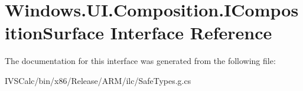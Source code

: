 \hypertarget{interface_windows_1_1_u_i_1_1_composition_1_1_i_composition_surface}{}\section{Windows.\+U\+I.\+Composition.\+I\+Composition\+Surface Interface Reference}
\label{interface_windows_1_1_u_i_1_1_composition_1_1_i_composition_surface}


The documentation for this interface was generated from the following file\+:\begin{DoxyCompactItemize}
\item 
I\+V\+S\+Calc/bin/x86/\+Release/\+A\+R\+M/ilc/Safe\+Types.\+g.\+cs\end{DoxyCompactItemize}
